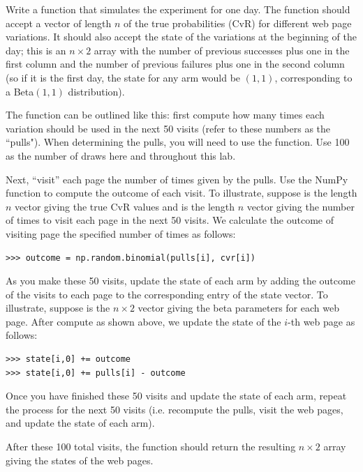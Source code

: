 \begin{problem}
Write a function that simulates the experiment for one day.
The function should accept a vector of length $n$ of the true probabilities (CvR)
for different web page variations.  It should also accept the state of the variations
at the beginning of the day; this is an $n \times 2$ array with the number of previous
successes plus one in the first column and the number of previous failures plus one in
the second column (so if it is the first day, the state for any arm would be $(1,1)$,
corresponding to a Beta$(1,1)$ distribution).

The function can be outlined like this: first compute how many times each variation
should be used in the next 50 visits (refer to these numbers as the ``pulls"). 
When determining the pulls, you will need to use
the  function.  Use 100 as the number of draws here and throughout this lab.

Next, ``visit'' each page the number of times given by the pulls.
Use the NumPy function  to compute the outcome of each visit.
To illustrate, suppose  is the length $n$ vector giving the true CvR values
and  is the length $n$ vector giving the number of times to visit each page
in the next 50 visits. We calculate the outcome of visiting page  the
specified number of times as follows:
\begin{lstlisting}
>>> outcome = np.random.binomial(pulls[i], cvr[i])
\end{lstlisting}

As you make these 50 visits, update the state of each arm by adding the outcome of the visits
to each page to the corresponding entry of the state vector. 
To illustrate, suppose  is the $n \times 2$ vector giving the beta parameters
for each web page. After compute  as shown above, we update the 
state of the $i$-th web page as follows:
\begin{lstlisting}
>>> state[i,0] += outcome
>>> state[i,0] += pulls[i] - outcome
\end{lstlisting}

Once you have finished these 50 visits and update the state of each arm,
repeat the process for the next 50 visits (i.e. recompute the pulls,
visit the web pages, and update the state of each arm).

After these 100 total visits, 
the function should return the resulting $n\times 2$ array giving the states of the web pages.
\end{problem}

